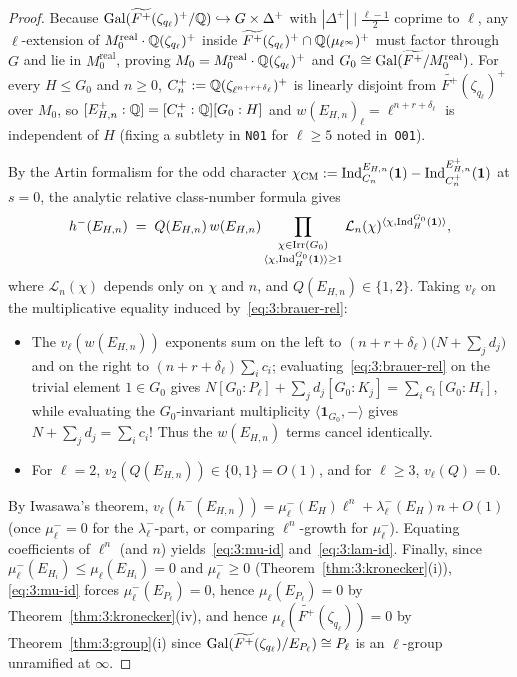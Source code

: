 \begin{proof}
Because $\mathrm{Gal}(\widetilde{F^+}(\zeta_{q_\ell})^+/\mathbb{Q}) \hookrightarrow G \times \Delta^+$ with $|\Delta^+| \mid \frac{\ell-1}{2}$ coprime to $\ell$, any $\ell$-extension of $M_0^{\mathrm{real}}\cdot\mathbb{Q}(\zeta_{q_\ell})^+$ inside $\widetilde{F^+}(\zeta_{q_\ell})^+ \cap \mathbb{Q}(\mu_{\ell^\infty})^+$ must factor through $G$ and lie in $M_0^{\mathrm{real}}$, proving $M_0 = M_0^{\mathrm{real}}\cdot \mathbb{Q}(\zeta_{q_\ell})^+$ and $G_0 \cong \mathrm{Gal}(\widetilde{F^+}/M_0^{\mathrm{real}})$. For every $H \le G_0$ and $n \ge 0$, $C_n^+ := \mathbb{Q}(\zeta_{\ell^{n+r+\delta_\ell}})^+$ is linearly disjoint from $\widetilde{F^+}(\zeta_{q_\ell})^+$ over $M_0$, so $[E_{H,n}^+ : \mathbb{Q}] = [C_n^+:\mathbb{Q}][G_0:H]$ and $w(E_{H,n})_\ell = \ell^{n+r+\delta_\ell}$ is independent of $H$ (fixing a subtlety in \texttt{N01} for $\ell \ge 5$ noted in~\texttt{O01}).

By the Artin formalism for the odd character $\chi_{\mathrm{CM}} := \mathrm{Ind}_{C_n}^{E_{H,n}}(\mathbf{1}) - \mathrm{Ind}_{C_n^+}^{E_{H,n}^+}(\mathbf{1})$ at $s=0$, the analytic relative class-number formula gives
\[
  h^-(E_{H,n}) \;=\; Q(E_{H,n})\, w(E_{H,n}) \prod_{\substack{\chi \in \mathrm{Irr}(G_0) \\ \langle \chi, \mathrm{Ind}_H^{G_0}(\mathbf{1})\rangle \ge 1}} \mathcal{L}_n(\chi)^{\langle \chi, \mathrm{Ind}_H^{G_0}(\mathbf{1})\rangle},
\]
where $\mathcal{L}_n(\chi)$ depends only on $\chi$ and $n$, and $Q(E_{H,n}) \in \{1, 2\}$. Taking $v_\ell$ on the multiplicative equality induced by~\eqref{eq:3:brauer-rel}:
\begin{itemize}
\item The $v_\ell(w(E_{H,n}))$ exponents sum on the left to $(n + r + \delta_\ell)\bigl(N + \sum_j d_j\bigr)$ and on the right to $(n + r + \delta_\ell)\sum_i c_i$; evaluating~\eqref{eq:3:brauer-rel} on the trivial element $1 \in G_0$ gives $N[G_0:P_\ell] + \sum_j d_j[G_0:K_j] = \sum_i c_i[G_0:H_i]$, while evaluating the $G_0$-invariant multiplicity $\langle \mathbf{1}_{G_0}, -\rangle$ gives $N + \sum_j d_j = \sum_i c_i$! Thus the $w(E_{H,n})$ terms cancel identically.
\item For $\ell = 2$, $v_2(Q(E_{H,n})) \in \{0, 1\} = O(1)$, and for $\ell \ge 3$, $v_\ell(Q) = 0$.
\end{itemize}
By Iwasawa's theorem, $v_\ell(h^-(E_{H,n})) = \mu_\ell^-(E_H) \ell^n + \lambda_\ell^-(E_H) n + O(1)$ (once $\mu_\ell^- = 0$ for the $\lambda_\ell^-$-part, or comparing $\ell^n$-growth for $\mu_\ell^-$). Equating coefficients of $\ell^n$ (and $n$) yields~\eqref{eq:3:mu-id} and~\eqref{eq:3:lam-id}. Finally, since $\mu_\ell^-(E_{H_i}) \le \mu_\ell(E_{H_i}) = 0$ and $\mu_\ell^- \ge 0$ (Theorem~\ref{thm:3:kronecker}(i)), \eqref{eq:3:mu-id} forces $\mu_\ell^-(E_{P_\ell}) = 0$, hence $\mu_\ell(E_{P_\ell}) = 0$ by Theorem~\ref{thm:3:kronecker}(iv), and hence $\mu_\ell(\widetilde{F^+}(\zeta_{q_\ell})) = 0$ by Theorem~\ref{thm:3:group}(i) since $\mathrm{Gal}(\widetilde{F^+}(\zeta_{q_\ell})/E_{P_\ell}) \cong P_\ell$ is an $\ell$-group unramified at $\infty$.
\end{proof}

